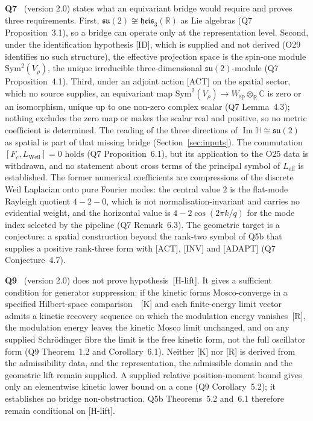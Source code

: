 \documentclass[11pt,a4paper]{article}
\theoremstyle{definition}
\newcommand{\su}{\mathfrak{su}}
\newcommand{\heis}{\mathfrak{heis}}
\newcommand{\Leff}{L_{\mathrm{eff}}}
\newcommand{\Sym}{\mathrm{Sym}}
\renewcommand{\Im}{\operatorname{Im}}
\begin{document}
      \textbf{Q7}~\cite{Beau2026q7} (version 2.0) states what an equivariant bridge would
      require and proves three requirements.
      First, $\su(2) \not\cong \heis_3(\mathbb{R})$ as Lie algebras (Q7 Proposition~3.1), so a
      bridge can operate only at the representation level.
      Second, under the identification hypothesis [ID], which is supplied and not derived (O29
      identifies no such structure), the effective projection space is the spin-one module
      $\Sym^2(V_\rho)$, the unique irreducible three-dimensional $\su(2)$-module (Q7
      Proposition~4.1).
      Third, under an adjoint action [ACT] on the spatial sector, which no source supplies, an
      equivariant map $\Sym^2(V_\rho) \to W_{\mathrm{sp}} \otimes_\mathbb{R} \mathbb{C}$ is zero or
      an isomorphism, unique up to one non-zero complex scalar (Q7 Lemma~4.3); nothing excludes
      the zero map or makes the scalar real and positive, so no metric coefficient is determined.
      The reading of the three directions of $\Im\mathbb{H} \cong \su(2)$ as spatial is part of
      that missing bridge (Section~\ref{sec:inputs}).
      The commutation $[F_c, L_{\mathrm{Weil}}] = 0$ holds (Q7 Proposition~6.1), but its
      application to the O25 data is withdrawn, and no statement about cross terms of the
      principal symbol of $\Leff$ is established.
      The former numerical coefficients are compressions of the discrete Weil Laplacian onto pure
      Fourier modes: the central value $2$ is the flat-mode Rayleigh quotient $4 - 2 - 0$, which
      is not normalisation-invariant and carries no evidential weight, and the horizontal value
      is $4 - 2\cos(2\pi k/q)$ for the mode index selected by the pipeline (Q7 Remark~6.3).
      The geometric target is a conjecture: a spatial construction beyond the rank-two symbol of
      Q5b that supplies a positive rank-three form with [ACT], [INV] and [ADAPT] (Q7
      Conjecture~4.7).

      \textbf{Q9}~\cite{Beau2026q9} (version 2.0) does not prove hypothesis~[H-lift].
      It gives a sufficient condition for generator suppression: if the kinetic forms
      Mosco-converge in a specified Hilbert-space comparison~\cite{KuwaeShioya2003}~[K] and each finite-energy limit
      vector admits a kinetic recovery sequence on which the modulation energy vanishes~[R], the
      modulation energy leaves the kinetic Mosco limit unchanged, and on any supplied
      Schr\"{o}dinger fibre the limit is the free kinetic form, not the full oscillator form
      (Q9 Theorem~1.2 and Corollary~6.1).
      Neither [K] nor [R] is derived from the admissibility data, and the representation, the
      admissible domain and the geometric lift remain supplied.
      A supplied relative position-moment bound gives only an elementwise kinetic lower bound on
      a cone (Q9 Corollary~5.2); it establishes no bridge non-obstruction.
      Q5b Theorems~5.2 and~6.1 therefore remain conditional on [H-lift].
\end{document}
